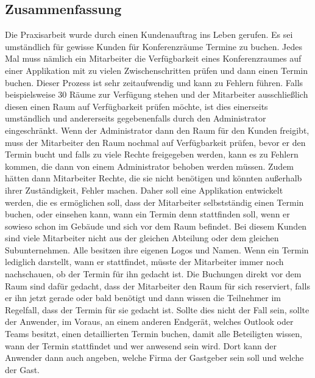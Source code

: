 
\subsection{Zusammenfassung}
Die Praxisarbeit wurde durch einen Kundenauftrag ins Leben gerufen.
Es sei umständlich für gewisse Kunden für Konferenzräume Termine zu buchen.
Jedes Mal muss nämlich ein Mitarbeiter die Verfügbarkeit eines Konferenzraumes auf einer Applikation mit zu vielen Zwischenschritten prüfen und dann einen Termin buchen.
Dieser Prozess ist sehr zeitaufwendig und kann zu Fehlern führen.
Falls beispielsweise 30 Räume zur Verfügung stehen und der Mitarbeiter ausschließlich diesen einen Raum auf Verfügbarkeit prüfen möchte, ist dies einerseits umständlich und andererseits gegebenenfalls durch den Administrator eingeschränkt.
Wenn der Administrator dann den Raum für den Kunden freigibt, muss der Mitarbeiter den Raum nochmal auf Verfügbarkeit prüfen, bevor er den Termin bucht und falls zu viele Rechte freigegeben werden, kann es zu Fehlern kommen,
die dann von einem Administrator behoben werden müssen.
Zudem hätten dann Mitarbeiter Rechte, die sie nicht benötigen und könnten außerhalb ihrer Zuständigkeit, Fehler machen.
\newline
Daher soll eine Applikation entwickelt werden, die es ermöglichen soll, dass der Mitarbeiter selbstständig einen Termin buchen, oder einsehen kann, wann ein Termin denn stattfinden soll, wenn er sowieso schon im Gebäude und sich vor dem Raum befindet.
\newline
Bei diesem Kunden sind viele Mitarbeiter nicht aus der gleichen Abteilung oder dem gleichen Subunternehmen.
Alle besitzen ihre eigenen Logos und Namen.
Wenn ein Termin lediglich darstellt, wann er stattfindet, müsste der Mitarbeiter immer noch nachschauen, ob der Termin für ihn gedacht ist.
Die Buchungen direkt vor dem Raum sind dafür gedacht, dass der Mitarbeiter den Raum für sich reserviert, falls er ihn jetzt gerade oder bald benötigt und dann wissen die Teilnehmer im Regelfall, dass der Termin für sie gedacht ist.
\newline
Sollte dies nicht der Fall sein, sollte der Anwender, im Voraus, an einem anderen Endgerät, welches Outlook oder Teams besitzt, einen detaillierten Termin buchen, damit alle Beteiligten wissen, wann der Termin stattfindet und wer anwesend sein wird.
Dort kann der Anwender dann auch angeben, welche Firma der Gastgeber sein soll und welche der Gast.

